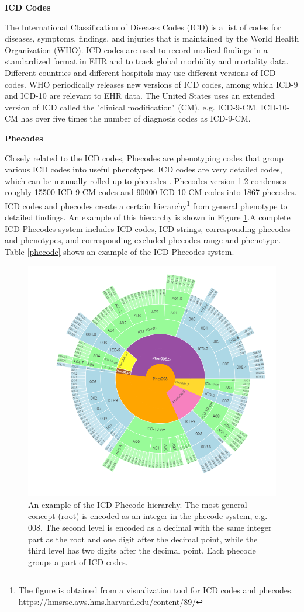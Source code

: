 \textbf{ICD Codes}

The International Classification of Diseases Codes (ICD) is a list of codes for diseases, symptoms, findings, and injuries that is maintained by the World Health Organization (WHO). ICD codes are used to record medical findings in a standardized format in EHR and to track global morbidity and mortality data. Different countries and different hospitals may use different versions of ICD codes. WHO periodically releases new versions of ICD codes, among which ICD-9 and ICD-10 are relevant to EHR data. The United States uses an extended version of ICD called the "clinical modification" (CM), e.g. ICD-9-CM. ICD-10-CM has over five times the number of diagnosis codes as ICD-9-CM.

\textbf{Phecodes}

Closely related to the ICD codes, Phecodes are phenotyping codes that group various ICD codes into useful phenotypes. ICD codes are very detailed codes, which can be manually rolled up to phecodes \cite{icd9-phecode,icd10-phecode}. Phecodes version 1.2 condenses roughly 15500 ICD-9-CM codes and 90000 ICD-10-CM codes into 1867 phecodes. ICD codes and phecodes create a certain hierarchy\footnote{The figure is obtained from a visualization tool for ICD codes and phecodes.  \url{https://hmsrsc.aws.hms.harvard.edu/content/89/}} from general phenotype to detailed findings. An example of this hierarchy is shown in Figure \ref{fig:phecode_hier}.A complete ICD-Phecodes system includes ICD codes, ICD strings, corresponding phecodes and phenotypes, and corresponding excluded phecodes range and phenotype. Table \ref{phecode} shows an example of the ICD-Phecodes system. 
\begin{figure}[ht]
    \centering
    \includegraphics[width=0.9\linewidth]{images/phecode_hierarchy.png}
    \caption{An example of the ICD-Phecode hierarchy. The most general concept (root) is encoded as an integer in the phecode system, e.g. 008. The second level is encoded as a decimal with the same integer part as the root and one digit after the decimal point, while the third level has two digits after the decimal point. Each phecode groups a part of ICD codes.}
    \label{fig:phecode_hier}
\end{figure}

